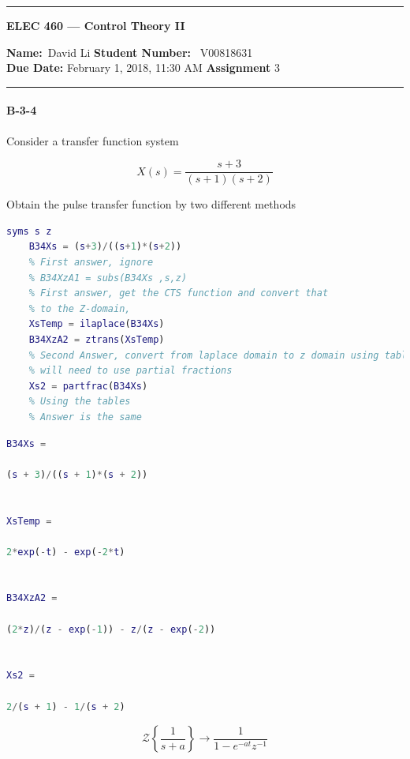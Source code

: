 
\begin{center}
	\hrule
	\vspace{.4cm}
	{\textbf { \large ELEC 460 --- Control Theory II}}
\end{center}
{\textbf{Name:}\ David Li \hspace{\fill} \textbf{Student Number:} \ V00818631}  \\
{\textbf{Due Date:} February 1, 2018, 11:30 AM \hspace{\fill} \textbf{Assignment}  3}\\
\hrule


\paragraph{B-3-4}

Consider a transfer function system

$$ X(s)=\frac{s+3}{(s+1)(s+2)}$$

Obtain the pulse transfer function by two different methods

\begin{lstlisting}[language=Matlab,caption=Matlab Code for B-2-17]
	syms s z
	B34Xs = (s+3)/((s+1)*(s+2))
	% First answer, ignore
	% B34XzA1 = subs(B34Xs ,s,z)
	% First answer, get the CTS function and convert that
	% to the Z-domain,
	XsTemp = ilaplace(B34Xs)
	B34XzA2 = ztrans(XsTemp)
	% Second Answer, convert from laplace domain to z domain using tables
	% will need to use partial fractions
	Xs2 = partfrac(B34Xs)
	% Using the tables
	% Answer is the same
\end{lstlisting}

\begin{lstlisting}[language=Matlab,caption=Matlab Code for B-2-17]
B34Xs =
 
(s + 3)/((s + 1)*(s + 2))
 
 
XsTemp =
 
2*exp(-t) - exp(-2*t)
 
 
B34XzA2 =
 
(2*z)/(z - exp(-1)) - z/(z - exp(-2))
 
 
Xs2 =
 
2/(s + 1) - 1/(s + 2)
\end{lstlisting}
    \begin{par}
$$\mathcal{Z} \left\{\frac{1}{s+a} \right\} \rightarrow \frac{1}{1-e^{-at}z^{-1}} $$
\end{par} \vspace{1em}

